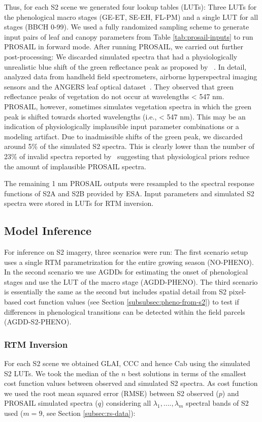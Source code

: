 Thus, for each S2 scene we generated four lookup tables (LUTs): Three LUTs for the phenological macro stages (GE-ET, SE-EH, FL-PM) and a single LUT for all stages (BBCH 0-99). We used a fully randomized sampling scheme to generate input pairs of leaf and canopy parameters from Table \ref{tab:prosail-inputs} to run PROSAIL in forward mode. After running PROSAIL, we carried out further post-processing: We discarded simulated spectra that had a physiologically unrealistic blue shift of the green reflectance peak as proposed by ~\cite{wocher_rtm-based_2020}. In detail,~\cite{wocher_rtm-based_2020} analyzed data from handheld field spectrometers, airborne hyperspectral imaging sensors and the ANGERS leaf optical dataset~\citep{jacquemoud_angers_2003}. They observed that green reflectance peaks of vegetation do not occur at wavelengths < 547 nm. PROSAIL, however, sometimes simulates vegetation spectra in which the green peak is shifted towards shorted wavelengths (i.e., < 547 nm). This may be an indication of physiologically implausible input parameter combinations or a modeling artifact. Due to inadmissible shifts of the green peak, we discarded around 5\% of the simulated S2 spectra. This is clearly lower than the number of 23\% of invalid spectra reported by~\cite{wocher_rtm-based_2020} suggesting that physiological priors reduce the amount of implausible PROSAIL spectra.

The remaining 1 nm PROSAIL outputs were resampled to the spectral response functions of S2A and S2B provided by ESA. Input parameters and simulated S2 spectra were stored in LUTs for RTM inversion. 

\subsection{Model Inference}
\label{subsec:model-inference}

For inference on S2 imagery, three scenarios were run: The first scenario setup uses a single RTM parametrization for the entire growing season (NO-PHENO). In the second scenario we use AGDDs for estimating the onset of phenological stages and use the LUT of the macro stage (AGDD-PHENO). The third scenario is essentially the same as the second but includes spatial detail from S2 pixel-based cost function values (see Section \ref{subsubsec:pheno-from-s2}) to test if differences in phenological transitions can be detected within the field parcels (AGDD-S2-PHENO).

\subsubsection{RTM Inversion}
For each S2 scene we obtained GLAI, CCC and hence Cab using the simulated S2 LUTs. We took the median of the $n$ best solutions in terms of the smallest cost function values between observed and simulated S2 spectra. As cost function we used the root mean squared error (RMSE) between S2 observed ($p$) and PROSAIL simulated spectra ($q$) considering all $\lambda_1, ...., \lambda_m$ spectral bands of S2 used ($m=9$, see Section \ref{subsec:rs-data}):

